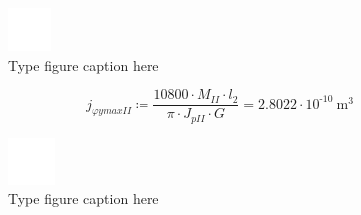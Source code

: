 \documentclass{article}
\newcommand{\defeq}{\coloneq} %
\begin{document}
\begin{figure}[h!]
 \begin{center}
  \includegraphics[max width=\textwidth]{calculations/907.png}
  \caption{Type figure caption here}
  \label{fig:907}
 \end{center}
\end{figure}
\begin{equation*}
j_{φymaxII} \defeq \frac{10800 \cdot M_{II} \cdot \textit{l}_{\textit{2}}}{{\pi} \cdot J_{pII} \cdot G} = {2.8022 \cdot 10^{ \operatorname{-} 10} \: \mathrm{m}^{3}}
\end{equation*}
\begin{figure}[h!]
 \begin{center}
  \includegraphics[max width=\textwidth]{calculations/909.png}
  \caption{Type figure caption here}
  \label{fig:909}
 \end{center}
\end{figure}
\end{document}
